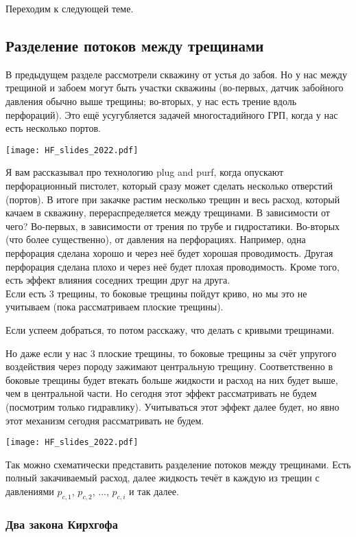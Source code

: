 \documentclass[main.tex]{subfiles}
\begin{document}
Переходим к следующей теме.

\subsection{Разделение потоков между трещинами}

В предыдущем разделе рассмотрели скважину от устья до забоя.
Но у нас между трещиной и забоем могут быть участки скважины (во-первых, датчик забойного давления обычно выше трещины; во-вторых, у нас есть трение вдоль перфораций).
Это ещё усугубляется задачей многостадийного ГРП, когда у нас есть несколько портов.

\texttt{[image: HF\_slides\_2022.pdf]}

Я вам рассказывал про технологию plug and purf, когда опускают перфорационный пистолет, который сразу может сделать несколько отверстий (портов).
В итоге при закачке растим несколько трещин и весь расход, который качаем в скважину, перераспределяется между трещинами.
В зависимости от чего?
Во-первых, в зависимости от трения по трубе и гидростатики.
Во-вторых (что более существенно), от давления на перфорациях.
Например, одна перфорация сделана хорошо и через неё будет хорошая проводимость.
Другая перфорация сделана плохо и через неё будет плохая проводимость.
Кроме того, есть эффект влияния соседних трещин друг на друга.
\\

Если есть 3 трещины, то боковые трещины пойдут криво, но мы это не учитываем (пока рассматриваем плоские трещины).

Если успеем добраться, то потом расскажу, что делать с кривыми трещинами.

Но даже если у нас 3 плоские трещины, то боковые трещины за счёт упругого воздействия через породу зажимают центральную трещину.
Соответственно в боковые трещины будет втекать больше жидкости и расход на них будет выше, чем в центральной части.
Но сегодня этот эффект рассматривать не будем (посмотрим только гидравлику).
Учитываться этот эффект далее будет, но явно этот механизм сегодня рассматривать не будем.

\texttt{[image: HF\_slides\_2022.pdf]}

Так можно схематически представить разделение потоков между трещинами.
Есть полный закачиваемый расход, далее жидкость течёт в каждую из трещин с давлениями $p_{c,1}$, $p_{c,2}$, ..., $p_{c,i}$ и так далее.

\subsubsection{Два закона Кирхгофа}
\end{document}
